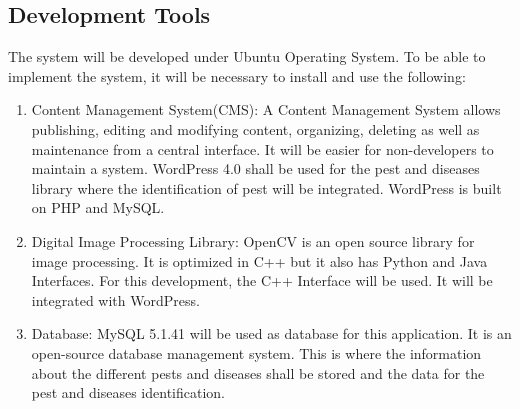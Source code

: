 \documentclass[journal]{./IEEE/IEEEtran}
\begin{document}
\subsection{Development Tools}
	The system will be developed under Ubuntu Operating System. To be able to implement the system, it will be necessary to install and use the following:
	\begin{enumerate}
		\item Content Management System(CMS): A Content Management System allows publishing, editing and modifying content, organizing, deleting as well as maintenance from a central interface. It will be easier for non-developers to maintain a system. WordPress 4.0 shall be used for the pest and diseases library where the identification of pest will be integrated. WordPress is built on PHP and MySQL.\cite{electronic_wp}
		\item Digital Image Processing Library: OpenCV is an open source library for image processing. It is optimized in C++ but it also has Python and Java Interfaces. For this development, the C++ Interface will be used. It will be integrated with WordPress.\cite{electronic_opencv}
		\item Database: MySQL 5.1.41 will be used as database for this application. It is an open-source database management system. This is where the information about the different pests and diseases shall be stored and the data for the pest and diseases identification.
	\end{enumerate} 
\end{document}
